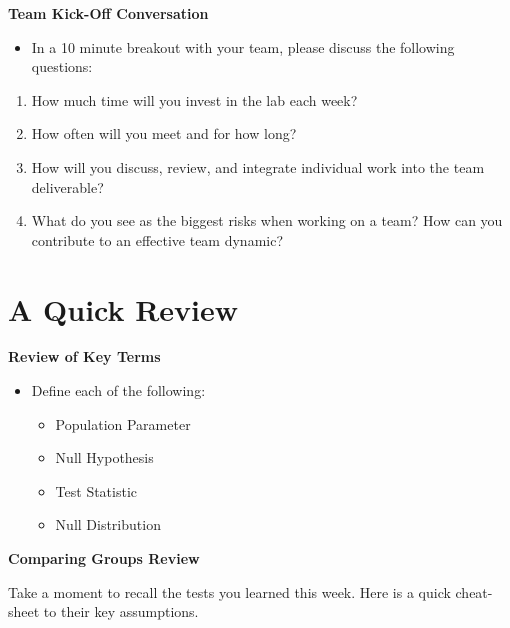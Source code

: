 \documentclass[
  letterpaper,
  DIV=11,
  numbers=noendperiod]{scrreprt}
\providecommand{\tightlist}{%
  \setlength{\itemsep}{0pt}\setlength{\parskip}{0pt}}\usepackage{longtable,booktabs,array}
\begin{document}
\textbf{Team Kick-Off Conversation}

\begin{itemize}
\tightlist
\item
  In a 10 minute breakout with your team, please discuss the following
  questions:
\end{itemize}

\begin{enumerate}
\def\labelenumi{\arabic{enumi}.}
\tightlist
\item
  How much time will you invest in the lab each week?
\item
  How often will you meet and for how long?
\item
  How will you discuss, review, and integrate individual work into the
  team deliverable?
\item
  What do you see as the biggest risks when working on a team? How can
  you contribute to an effective team dynamic?
\end{enumerate}

\section{A Quick Review}\label{a-quick-review}

\textbf{Review of Key Terms}

\begin{itemize}
\tightlist
\item
  Define each of the following:

  \begin{itemize}
  \tightlist
  \item
    Population Parameter
  \item
    Null Hypothesis
  \item
    Test Statistic
  \item
    Null Distribution
  \end{itemize}
\end{itemize}

\textbf{Comparing Groups Review}

Take a moment to recall the tests you learned this week. Here is a quick
cheat-sheet to their key assumptions.
\end{document}
